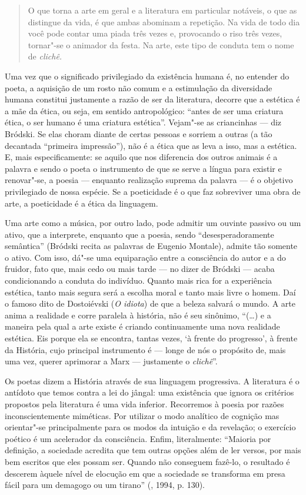 \begin{quotation}
O que torna a arte em geral e a literatura em particular
notáveis, o que as distingue da vida, é que ambas abominam a repetição. Na vida de todo dia você pode
contar uma piada três vezes e, provocando o riso três vezes, tornar"-se o
animador da festa. Na arte, este tipo de conduta tem o nome de
\emph{clichê.}
\end{quotation}

Uma vez que o significado privilegiado da existência humana é, no
entender do poeta, a aquisição de um rosto não comum e a
estimulação da diversidade humana constitui justamente a razão de ser da
literatura, decorre que a estética é a mãe da ética, ou seja, em sentido
antropológico: ``antes de ser uma criatura ética, o ser humano é uma
criatura estética''. Vejam"-se as criancinhas --- diz Bródski. Se elas
choram diante de certas pessoas e sorriem a outras (a tão decantada
``primeira impressão''), não é a ética que as leva a isso, mas a
estética. E, mais especificamente: se aquilo que nos diferencia
dos outros animais é a palavra e sendo o poeta o instrumento de que se
serve a língua para existir e renovar"-se, a poesia --- enquanto
realização suprema da palavra --- é o objetivo privilegiado de nossa
espécie. Se a poeticidade é o que faz sobreviver uma obra de arte, a
poeticidade é a ética da linguagem.

Uma arte como a música, por outro lado, pode admitir um ouvinte passivo
ou um ativo, que a interprete, enquanto que a poesia, sendo
``desesperadoramente semântica'' (Bródski recita as palavras de Eugenio Montale),
 admite tão somente o ativo. Com isso, dá"-se uma
equiparação entre a consciência do autor e a do fruidor, fato que, mais
cedo ou mais tarde --- no dizer de Bródski --- acaba condicionando a
conduta do indivíduo. Quanto mais rica for a experiência estética, tanto
mais segura será a escolha moral e tanto mais livre o homem. Daí o
famoso dito de Dostoiévski (\emph{O idiota}) de que a beleza salvará o mundo. A arte anima
a realidade e corre paralela à história, não é seu sinônimo, ``(\ldots{}) e a
maneira pela qual a arte existe é criando continuamente uma nova
realidade estética. Eis porque ela se encontra, tantas vezes, `à frente
do progresso', à frente da História, cujo principal instrumento é ---
longe de nós o propósito de, mais uma vez, querer aprimorar a Marx ---
justamente o \emph{clichê}''.

Os poetas dizem a História através de sua linguagem progressiva. A
literatura é o antídoto que temos contra a lei do jângal: uma existência
que ignora os critérios propostos pela literatura é uma vida inferior.
Recorremos à poesia por razões inconscientemente miméticas. Por utilizar
o modo analítico de cognição mas orientar"-se principalmente para os
modos da intuição e da revelação; o exercício poético é um acelerador da
consciência. Enfim, literalmente: ``Maioria por definição, a sociedade acredita que tem
outras opções além de ler versos, por mais bem
escritos que eles possam ser. Quando não conseguem fazê-lo, o resultado é descerem àquele nível de
 elocução em que a sociedade se transforma em presa fácil para um 
demagogo ou um tirano'' (, 1994, p. 130).


